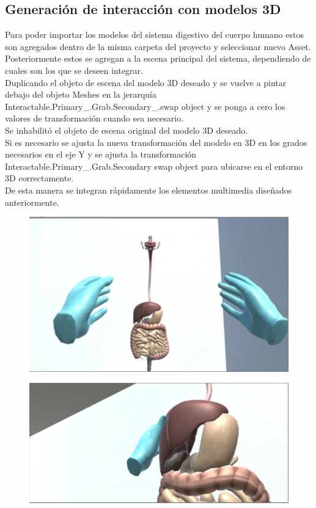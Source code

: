 \subsection{Generación de interacción con modelos 3D}
Para poder importar los modelos del sistema digestivo del cuerpo humano estos son agregados dentro de la misma carpeta del proyecto y seleccionar nuevo Asset.\\
Posteriormente estos se agregan a la escena principal del sistema, dependiendo de cuales son los que se deseen integrar.\\
Duplicando el objeto de escena del modelo 3D deseado y  se vuelve a pintar debajo del objeto Meshes en la jerarquía Interactable.Primary\_.Grab.Secondary\_.swap object y 
se ponga a cero los valores de transformación cuando sea necesario.\\
Se inhabilitó el objeto de escena original del modelo 3D deseado.\\
Si es necesario se ajusta la nueva transformación del modelo en 3D en los grados necesarios en el eje Y y se ajusta la transformación Interactable.Primary\_.Grab.Secondary 
swap object para ubicarse en el entorno 3D correctamente.\\
De esta manera se integran rápidamente los elementos multimedia diseñados anteriormente.\\
\begin{figure}[H]
	\begin{center}
 		\includegraphics[width = .5\textwidth]{source/images/image37.png}
	\end{center} 
\end{figure}
\begin{figure}[H]
	\begin{center}
 		\includegraphics[width = .5\textwidth]{source/images/image67.png}
	\end{center} 
\end{figure}

